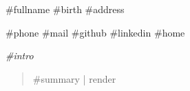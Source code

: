 \begin{multicols}{2}

  \header
  {#{fullname}}
  {#{birth}}
  {#{address}}

  \medskip

  \info
  {#{phone}}
  {#{mail}}
  {#{github}}
  {#{linkedin}}
  {#{home}}

  \vfill

  {
  \itshape
  #{intro}
  }

  \columnbreak

  \begin{abstract}
    #{summary | render}
  \end{abstract}


\end{multicols}
